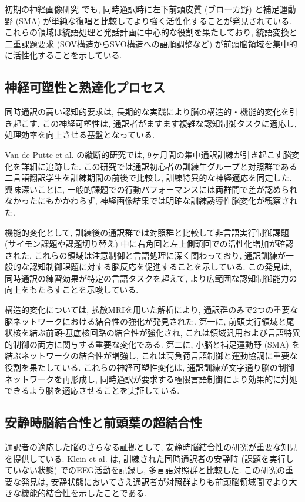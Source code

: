初期の神経画像研究 \cite{rinne2000left} でも, 同時通訳時に左下前頭皮質 (ブローカ野) と補足運動野 (SMA) が単純な復唱と比較してより強く活性化することが発見されている.
これらの領域は統語処理と発話計画に中心的な役割を果たしており, 統語変換と二重課題要求 (SOV構造からSVO構造への語順調整など) が前頭脳領域を集中的に活性化することを示している.

\subsection{神経可塑性と熟達化プロセス}

同時通訳の高い認知的要求は, 長期的な実践により脳の構造的・機能的変化を引き起こす.
この神経可塑性は, 通訳者がますます複雑な認知制御タスクに適応し, 処理効率を向上させる基盤となっている.

Van de Putte et al. \cite{vandeputte2018anatomical} の縦断的研究では, 9ヶ月間の集中通訳訓練が引き起こす脳変化を詳細に追跡した.
この研究では通訳初心者の訓練生グループと対照群である二言語翻訳学生を訓練期間の前後で比較し, 訓練特異的な神経適応を同定した.
興味深いことに, 一般的課題での行動パフォーマンスには両群間で差が認められなかったにもかかわらず, 神経画像結果では明確な訓練誘導性脳変化が観察された.

機能的変化として, 訓練後の通訳群では対照群と比較して非言語実行制御課題 (サイモン課題や課題切り替え) 中に右角回と左上側頭回での活性化増加が確認された.
これらの領域は注意制御と言語処理に深く関わっており, 通訳訓練が一般的な認知制御課題に対する脳反応を促進することを示している.
この発見は, 同時通訳の練習効果が特定の言語タスクを超えて, より広範囲な認知制御能力の向上をもたらすことを示唆している.

構造的変化については, 拡散MRIを用いた解析により, 通訳群のみで2つの重要な脳ネットワークにおける結合性の強化が発見された.
第一に, 前頭実行領域と尾状核を結ぶ前頭-基底核回路の結合性が強化され, これは領域汎用および言語特異的制御の両方に関与する重要な変化である.
第二に, 小脳と補足運動野 (SMA) を結ぶネットワークの結合性が増強し, これは高負荷言語制御と運動協調に重要な役割を果たしている.
これらの神経可塑性変化は, 通訳訓練が文字通り脳の制御ネットワークを再形成し, 同時通訳が要求する極限言語制御により効果的に対処できるよう脳を適応させることを実証している.

\subsection{安静時脳結合性と前頭葉の超結合性}

通訳者の適応した脳のさらなる証拠として, 安静時脳結合性の研究が重要な知見を提供している.
Klein et al. \cite{klein2018interpreter} は, 訓練された同時通訳者の安静時 (課題を実行していない状態) でのEEG活動を記録し, 多言語対照群と比較した.
この研究の重要な発見は, 安静状態においてさえ通訳者が対照群よりも前頭脳領域間でより大きな機能的結合性を示したことである.

